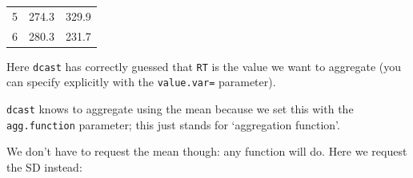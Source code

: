 \documentclass[]{article}
\newenvironment{Shaded}{\begin{snugshade}}{\end{snugshade}}
\newcommand{\KeywordTok}[1]{\textcolor[rgb]{0.13,0.29,0.53}{\textbf{#1}}}
\newcommand{\DataTypeTok}[1]{\textcolor[rgb]{0.13,0.29,0.53}{#1}}
\newcommand{\StringTok}[1]{\textcolor[rgb]{0.31,0.60,0.02}{#1}}
\newcommand{\OperatorTok}[1]{\textcolor[rgb]{0.81,0.36,0.00}{\textbf{#1}}}
\newcommand{\NormalTok}[1]{#1}
\theoremstyle{definition}
\theoremstyle{definition}
\theoremstyle{definition}
\theoremstyle{remark}
\begin{document}
\begin{longtable}[]{@{}ccc@{}}
\begin{minipage}[t]{0.11\columnwidth}
5\strut
\end{minipage} & \begin{minipage}[t]{0.10\columnwidth}\centering\strut
274.3\strut
\end{minipage} & \begin{minipage}[t]{0.10\columnwidth}\centering\strut
329.9\strut
\end{minipage}\tabularnewline
\begin{minipage}[t]{0.11\columnwidth}\centering\strut
6\strut
\end{minipage} & \begin{minipage}[t]{0.10\columnwidth}\centering\strut
280.3\strut
\end{minipage} & \begin{minipage}[t]{0.10\columnwidth}\centering\strut
231.7\strut
\end{minipage}\tabularnewline
\bottomrule
\end{longtable}

Here \texttt{dcast} has correctly guessed that \texttt{RT} is the value
we want to aggregate (you can specify explicitly with the
\texttt{value.var=} parameter).

\texttt{dcast} knows to aggregate using the mean because we set this
with the \texttt{agg.function} parameter; this just stands for
`aggregation function'.

We don't have to request the mean though: any function will do. Here we
request the SD instead:

\begin{Shaded}
\end{Shaded}
\end{document}
